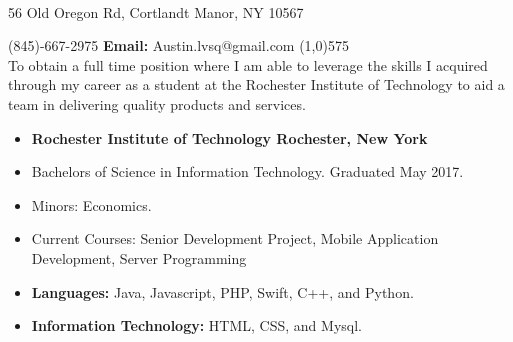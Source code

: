 \documentclass[10pt]{article}
\begin{document}
\begin{center}
\\
\vspace{.3ex}
56 Old Oregon Rd, Cortlandt Manor, NY 10567
\end{center}
 (845)-667-2975 \hfill {\bf Email:} Austin.lvsq@gmail.com
\line(1,0){575}\\

To obtain a full time position where I am able to leverage the skills I acquired through my career as a student at the Rochester Institute of Technology to aid a team in delivering quality products and services.
\vspace{.75ex}\\
\begin{itemize}[topsep=1ex, itemsep=.25ex, partopsep=0ex, parsep=0ex]
	\item[]{{\bf Rochester Institute of Technology \hfill Rochester, New York}}
  \item[] Bachelors of Science in Information Technology. \hfill Graduated May 2017.
  \item[] Minors: Economics.
  \item[] {Current Courses:} Senior Development Project, Mobile Application Development, Server Programming
\end{itemize}
\vspace{1ex}
\begin{itemize} [topsep=1ex, itemsep=.25ex, partopsep=0ex, parsep=0ex]
	\item[] {\bf Languages:} Java, Javascript, PHP, Swift, C++, and Python.
 	\item[] {\bf Information Technology:} HTML, CSS, and Mysql.
\end{itemize}
\vspace{.75ex}
\end{document}
